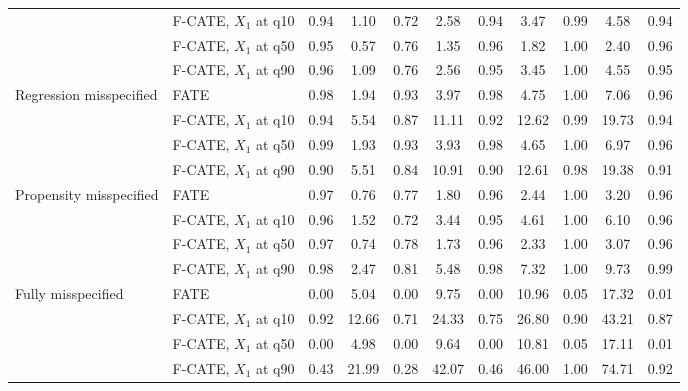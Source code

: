 {\begin{table}[h]
\begin{tabular}{llccccccccc}
 & F-CATE, $X_1$ at q10 & 0.94 & 1.10 & 0.72 & 2.58 & 0.94 & 3.47 & 0.99 & 4.58 & 0.94 \\
 & F-CATE, $X_1$ at q50 & 0.95 & 0.57 & 0.76 & 1.35 & 0.96 & 1.82 & 1.00 & 2.40 & 0.96 \\
 & F-CATE, $X_1$ at q90 & 0.96 & 1.09 & 0.76 & 2.56 & 0.95 & 3.45 & 1.00 & 4.55 & 0.95 \\
\midrule
Regression misspecified & FATE & 0.98 & 1.94 & 0.93 & 3.97 & 0.98 & 4.75 & 1.00 & 7.06 & 0.96 \\
 & F-CATE, $X_1$ at q10 & 0.94 & 5.54 & 0.87 & 11.11 & 0.92 & 12.62 & 0.99 & 19.73 & 0.94 \\
 & F-CATE, $X_1$ at q50 & 0.99 & 1.93 & 0.93 & 3.93 & 0.98 & 4.65 & 1.00 & 6.97 & 0.96 \\
 & F-CATE, $X_1$ at q90 & 0.90 & 5.51 & 0.84 & 10.91 & 0.90 & 12.61 & 0.98 & 19.38 & 0.91 \\
\midrule
Propensity misspecified & FATE & 0.97 & 0.76 & 0.77 & 1.80 & 0.96 & 2.44 & 1.00 & 3.20 & 0.96 \\
 & F-CATE, $X_1$ at q10 & 0.96 & 1.52 & 0.72 & 3.44 & 0.95 & 4.61 & 1.00 & 6.10 & 0.96 \\
 & F-CATE, $X_1$ at q50 & 0.97 & 0.74 & 0.78 & 1.73 & 0.96 & 2.33 & 1.00 & 3.07 & 0.96 \\
 & F-CATE, $X_1$ at q90 & 0.98 & 2.47 & 0.81 & 5.48 & 0.98 & 7.32 & 1.00 & 9.73 & 0.99 \\
\midrule
Fully misspecified & FATE & 0.00 & 5.04 & 0.00 & 9.75 & 0.00 & 10.96 & 0.05 & 17.32 & 0.01 \\
 & F-CATE, $X_1$ at q10 & 0.92 & 12.66 & 0.71 & 24.33 & 0.75 & 26.80 & 0.90 & 43.21 & 0.87 \\
 & F-CATE, $X_1$ at q50 & 0.00 & 4.98 & 0.00 & 9.64 & 0.00 & 10.81 & 0.05 & 17.11 & 0.01 \\
 & F-CATE, $X_1$ at q90 & 0.43 & 21.99 & 0.28 & 42.07 & 0.46 & 46.00 & 1.00 & 74.71 & 0.92 \\
\bottomrule
\end{tabular}
\end{table}
}
